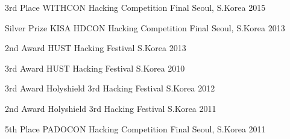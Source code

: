 \begin{cvhonors}

  \cvhonor
    {3rd Place} %
    {WITHCON Hacking Competition Final} %
    {Seoul, S.Korea} %
    {2015} %

  \cvhonor
    {Silver Prize} %
    {KISA HDCON Hacking Competition Final} %
    {Seoul, S.Korea} %
    {2013} %

  \cvhonor
    {2nd Award} %
    {HUST Hacking Festival} %
    {S.Korea} %
    {2013} %

  \cvhonor
    {3rd Award} %
    {HUST Hacking Festival} %
    {S.Korea} %
    {2010} %

  \cvhonor
    {3rd Award} %
    {Holyshield 3rd Hacking Festival} %
    {S.Korea} %
    {2012} %

  \cvhonor
    {2nd Award} %
    {Holyshield 3rd Hacking Festival} %
    {S.Korea} %
    {2011} %

  \cvhonor
    {5th Place} %
    {PADOCON Hacking Competition Final} %
    {Seoul, S.Korea} %
    {2011} %

\end{cvhonors}
